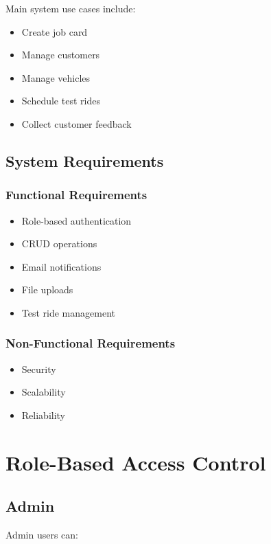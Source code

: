 \documentclass[12pt,a4paper]{report}
\begin{document}
Main system use cases include:

\begin{itemize}
\item Create job card
\item Manage customers
\item Manage vehicles
\item Schedule test rides
\item Collect customer feedback
\end{itemize}

\section{System Requirements}

\subsection{Functional Requirements}

\begin{itemize}
\item Role-based authentication
\item CRUD operations
\item Email notifications
\item File uploads
\item Test ride management
\end{itemize}

\subsection{Non-Functional Requirements}

\begin{itemize}
\item Security
\item Scalability
\item Reliability
\end{itemize}

\chapter{Role-Based Access Control}

\section{Admin}

Admin users can:
\end{document}
